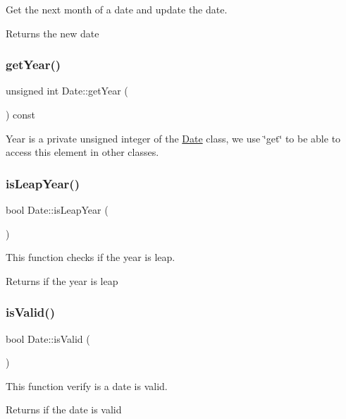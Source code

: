 Get the next month of a date and update the date. \begin{DoxyReturn}{Returns}
the new date 
\end{DoxyReturn}
\hypertarget{classDate_a597b505c264a24d34369c43119fc4e6e}{}\label{classDate_a597b505c264a24d34369c43119fc4e6e} 
\subsubsection{\texorpdfstring{get\+Year()}{getYear()}}
{\footnotesize\ttfamily unsigned int Date\+::get\+Year (\begin{DoxyParamCaption}{ }\end{DoxyParamCaption}) const}

Year is a private unsigned integer of the \hyperlink{classDate}{Date} class, we use \char`\"{}get\char`\"{} to be able to access this element in other classes. \hypertarget{classDate_ab83816d7572d1a15c6e86378b82a54f0}{}\label{classDate_ab83816d7572d1a15c6e86378b82a54f0} 
\subsubsection{\texorpdfstring{is\+Leap\+Year()}{isLeapYear()}}
{\footnotesize\ttfamily bool Date\+::is\+Leap\+Year (\begin{DoxyParamCaption}{ }\end{DoxyParamCaption})\hspace{0.3cm}{\ttfamily [private]}}

This function checks if the year is leap. \begin{DoxyReturn}{Returns}
if the year is leap 
\end{DoxyReturn}
\hypertarget{classDate_a7d9aaa9db591413e21c8b85fdae130ad}{}\label{classDate_a7d9aaa9db591413e21c8b85fdae130ad} 
\subsubsection{\texorpdfstring{is\+Valid()}{isValid()}}
{\footnotesize\ttfamily bool Date\+::is\+Valid (\begin{DoxyParamCaption}{ }\end{DoxyParamCaption})}

This function verify is a date is valid. \begin{DoxyReturn}{Returns}
if the date is valid 
\end{DoxyReturn}
\hypertarget{classDate_a9cd38c6d1cc0e326baef6ab8a25029b8}{}\label{classDate_a9cd38c6d1cc0e326baef6ab8a25029b8} 
